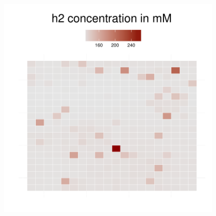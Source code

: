 \begin{figure}[h]
{\begin{minipage}[t]{0.3\textwidth}
  \end{minipage}
  \begin{minipage}[t]{0.3\textwidth}
    \includegraphics[width=\textwidth]{../results/beijerinckii_20x20_seed943_h265.pdf}
  \end{minipage}
  }
\end{figure}
